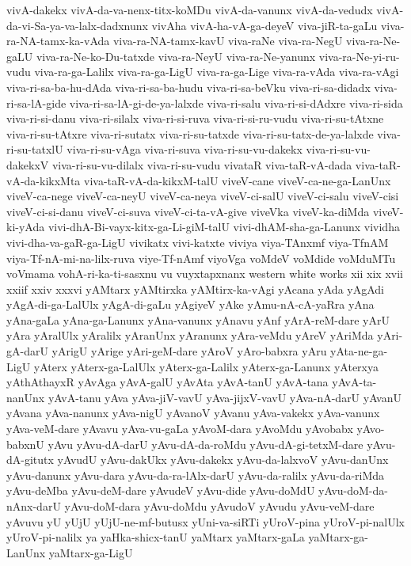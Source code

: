 {vivA-dakekx
vivA-da-va-nenx-titx-koMDu
vivA-da-vanunx
vivA-da-vedudx
vivA-da-vi-Sa-ya-va-lalx-dadxnunx
vivAha
vivA-ha-vA-ga-deyeV
viva-jiR-ta-gaLu
viva-ra-NA-tamx-ka-vAda
viva-ra-NA-tamx-kavU
viva-raNe
viva-ra-NegU
viva-ra-Ne-gaLU
viva-ra-Ne-ko-Du-tatxde
viva-ra-NeyU
viva-ra-Ne-yanunx
viva-ra-Ne-yi-ru-vudu
viva-ra-ga-Lalilx
viva-ra-ga-LigU
viva-ra-ga-Lige
viva-ra-vAda
viva-ra-vAgi
viva-ri-sa-ba-hu-dAda
viva-ri-sa-ba-hudu
viva-ri-sa-beVku
viva-ri-sa-didadx
viva-ri-sa-lA-gide
viva-ri-sa-lA-gi-de-ya-lalxde
viva-ri-salu
viva-ri-si-dAdxre
viva-ri-sida
viva-ri-si-danu
viva-ri-silalx
viva-ri-si-ruva
viva-ri-si-ru-vudu
viva-ri-su-tAtxne
viva-ri-su-tAtxre
viva-ri-sutatx
viva-ri-su-tatxde
viva-ri-su-tatx-de-ya-lalxde
viva-ri-su-tatxlU
viva-ri-su-vAga
viva-ri-suva
viva-ri-su-vu-dakekx
viva-ri-su-vu-dakekxV
viva-ri-su-vu-dilalx
viva-ri-su-vudu
vivataR
viva-taR-vA-dada
viva-taR-vA-da-kikxMta
viva-taR-vA-da-kikxM-talU
viveV-cane
viveV-ca-ne-ga-LanUnx
viveV-ca-nege
viveV-ca-neyU
viveV-ca-neya
viveV-ci-salU
viveV-ci-salu
viveV-cisi
viveV-ci-si-danu
viveV-ci-suva
viveV-ci-ta-vA-give
viveVka
viveV-ka-diMda
viveV-ki-yAda
vivi-dhA-Bi-vayx-kitx-ga-Li-giM-talU
vivi-dhAM-sha-ga-Lanunx
vividha
vivi-dha-va-gaR-ga-LigU
vivikatx
vivi-katxte
viviya
viya-TAnxmf
viya-TfnAM
viya-Tf-nA-mi-na-lilx-ruva
viye-Tf-nAmf
viyoVga
voMdeV
voMdide
voMduMTu
voVmama
vohA-ri-ka-ti-sasxnu
vu
vuyxtapxnanx
western
white
works
xii
xix
xvii
xxiif
xxiv
xxxvi
yAMtarx
yAMtirxka
yAMtirx-ka-vAgi
yAcana
yAda
yAgAdi
yAgA-di-ga-LalUlx
yAgA-di-gaLu
yAgiyeV
yAke
yAmu-nA-cA-yaRra
yAna
yAna-gaLa
yAna-ga-Lanunx
yAna-vanunx
yAnavu
yAnf
yArA-reM-dare
yArU
yAra
yAralUlx
yAralilx
yAranUnx
yAranunx
yAra-veMdu
yAreV
yAriMda
yAri-gA-darU
yArigU
yArige
yAri-geM-dare
yAroV
yAro-babxra
yAru
yAta-ne-ga-LigU
yAterx
yAterx-ga-LalUlx
yAterx-ga-Lalilx
yAterx-ga-Lanunx
yAterxya
yAthAthayxR
yAvAga
yAvA-galU
yAvAta
yAvA-tanU
yAvA-tana
yAvA-ta-nanUnx
yAvA-tanu
yAva
yAva-jiV-vavU
yAva-jijxV-vavU
yAva-nA-darU
yAvanU
yAvana
yAva-nanunx
yAva-nigU
yAvanoV
yAvanu
yAva-vakekx
yAva-vanunx
yAva-veM-dare
yAvavu
yAva-vu-gaLa
yAvoM-dara
yAvoMdu
yAvobabx
yAvo-babxnU
yAvu
yAvu-dA-darU
yAvu-dA-da-roMdu
yAvu-dA-gi-tetxM-dare
yAvu-dA-gitutx
yAvudU
yAvu-dakUkx
yAvu-dakekx
yAvu-da-lalxvoV
yAvu-danUnx
yAvu-danunx
yAvu-dara
yAvu-da-ra-lAlx-darU
yAvu-da-ralilx
yAvu-da-riMda
yAvu-deMba
yAvu-deM-dare
yAvudeV
yAvu-dide
yAvu-doMdU
yAvu-doM-da-nAnx-darU
yAvu-doM-dara
yAvu-doMdu
yAvudoV
yAvudu
yAvu-veM-dare
yAvuvu
yU
yUjU
yUjU-ne-mf-butusx
yUni-va-siRTi
yUroV-pina
yUroV-pi-nalUlx
yUroV-pi-nalilx
ya
yaHka-shicx-tanU
yaMtarx
yaMtarx-gaLa
yaMtarx-ga-LanUnx
yaMtarx-ga-LigU
}
